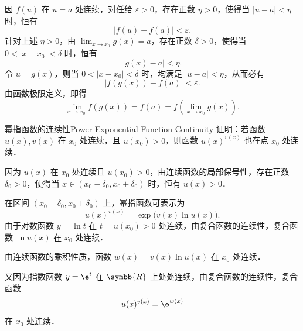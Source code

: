 \begin{myproof}
    因 $f(u)$ 在 $u = a$ 处连续，对任给 $\varepsilon > 0$，存在正数 $\eta > 0$，使得当 $|u - a| < \eta$ 时，恒有
    \begin{equation}
        |f(u) - f(a)| < \varepsilon.
    \end{equation}
    针对上述 $\eta > 0$，由 $\lim_{x\to x_0} g(x) = a$，存在正数 $\delta > 0$，使得当 $0 < |x - x_0| < \delta$ 时，恒有
    \begin{equation}
        |g(x) - a| < \eta.
    \end{equation}
    令 $u = g(x)$，则当 $0 < |x - x_0| < \delta$ 时，均满足 $|u - a| < \eta$，从而必有
    \begin{equation}
        |f(g(x)) - f(a)| < \varepsilon.
    \end{equation}
    由函数极限定义，即得
    \begin{equation}
        \lim_{x\to x_0} f(g(x)) = f(a) = f\left( \lim_{x\to x_0} g(x) \right).
    \end{equation}
\end{myproof}

\begin{problem}{幂指函数的连续性}{Power-Exponential-Function-Continuity}
    证明：若函数 $u(x), v(x)$ 在 $x_0$ 处连续，且 $u(x_0) > 0$，则函数 $u(x)^{v(x)}$ 也在点 $x_0$ 处连续．
\end{problem}

\begin{myproof}
    因为 $u(x)$ 在 $x_0$ 处连续且 $u(x_0) > 0$，由连续函数的局部保号性，存在正数 $\delta_0 > 0$，使得当 $x \in (x_0 - \delta_0, x_0 + \delta_0)$ 时，恒有 $u(x) > 0$．

    在区间 $(x_0 - \delta_0, x_0 + \delta_0)$ 上，幂指函数可表示为
    \begin{equation}
        u(x)^{v(x)} = \exp\bigl( v(x) \ln u(x) \bigr).
    \end{equation}
    由于对数函数 $y = \ln t$ 在 $t = u(x_0) > 0$ 处连续，由复合函数的连续性，复合函数 $\ln u(x)$ 在 $x_0$ 处连续．

    由连续函数的乘积性质，函数 $w(x) = v(x) \ln u(x)$ 在 $x_0$ 处连续．

    又因为指数函数 $y = \e^t$ 在 $\symbb{R}$ 上处处连续，由复合函数的连续性，复合函数
    \begin{equation}
        u(x)^{v(x)} = \e^{w(x)}
    \end{equation}
    在 $x_0$ 处连续．
\end{myproof}

